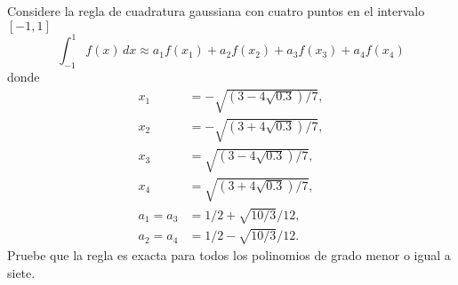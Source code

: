 \begin{statement}{4}
  Considere la regla de cuadratura gaussiana con cuatro puntos en el intervalo $[-1, 1]$
  \[
    \int_{-1}^1 f(x) \, dx \approx a_1 f(x_1) + a_2 f(x_2) + a_3 f(x_3) + a_4 f(x_4)
  \]
  donde
  \begin{align*}
    x_1 &= -\sqrt{(3 - 4 \sqrt{0.3}) / 7}, \\
    x_2 &= -\sqrt{(3 + 4 \sqrt{0.3}) / 7}, \\
    x_3 &= \sqrt{(3 - 4 \sqrt{0.3}) / 7}, \\
    x_4 &= \sqrt{(3 + 4 \sqrt{0.3}) / 7}, \\
    a_1 = a_3 &= 1/2 + \sqrt{10 / 3} / 12, \\
    a_2 = a_4 &= 1/2 - \sqrt{10 / 3} / 12.
  \end{align*}
  Pruebe que la regla es exacta para todos los polinomios de grado menor o igual a siete.
\end{statement}

